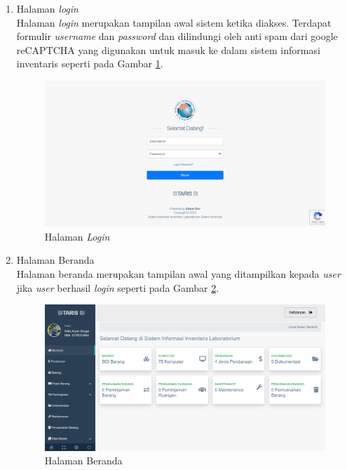 \begin{enumerate}
	\item Halaman \textit{login} \\ Halaman \textit{login} merupakan tampilan awal sistem ketika diakses. Terdapat formulir \textit{username} dan \textit{password} dan dilindungi oleh anti spam dari google reCAPTCHA yang digunakan untuk masuk ke dalam sistem informasi inventaris seperti pada Gambar \ref{fig:sitaris}.

	      \begin{figure}[h]
		      \centering
		      \includegraphics[width=1\linewidth]{konten//gambar/Login Page.png}
		      \caption{Halaman \textit{Login}}
		      \label{fig:sitaris}
	      \end{figure}

	\item Halaman Beranda \\ Halaman beranda merupakan tampilan awal yang ditampilkan kepada \textit{user} jika \textit{user} berhasil \textit{login} seperti pada Gambar \ref{fig:sitaris-login}.

	      \begin{figure}[h]
		      \centering
		      \includegraphics[width=1\linewidth]{konten//gambar/login berhasil.png}
		      \caption{Halaman Beranda}
		      \label{fig:sitaris-login}
	      \end{figure}


\end{enumerate}
